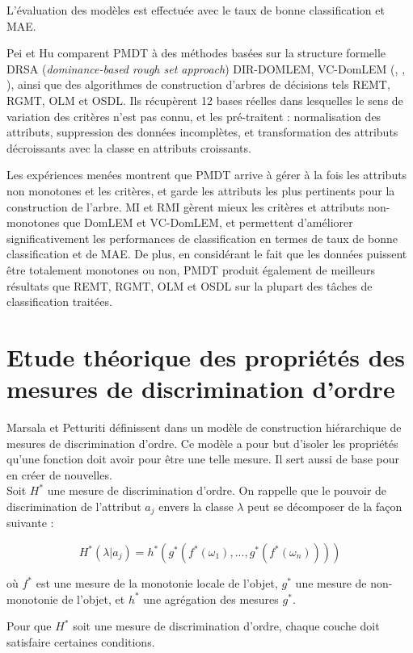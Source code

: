 \documentclass[a4paper]{article}
\begin{document}
L'évaluation des modèles est effectuée avec le taux de bonne classification et
MAE.

Pei et Hu comparent PMDT à des méthodes basées sur la structure formelle DRSA
(\emph{dominance-based rough set approach}) DIR-DOMLEM, VC-DomLEM
(\cite{blaszczynski-sequential}, \cite{blaszczynski-induction},
\cite{wang-induction}), ainsi que des algorithmes de construction d'arbres de
décisions tels REMT, RGMT, OLM et OSDL. Ils récupèrent 12 bases réelles dans
lesquelles le sens de variation des critères n'est pas connu, et les
pré-traitent : normalisation des attributs, suppression des données incomplètes,
et transformation des attributs décroissants avec la classe en attributs
croissants.

Les expériences menées montrent que PMDT arrive à gérer à la fois les attributs
non monotones et les critères, et garde les attributs les plus pertinents pour
la construction de l'arbre. MI et RMI gèrent mieux les critères et attributs
non-monotones que DomLEM et VC-DomLEM, et permettent d'améliorer
significativement les performances de classification en termes de taux de bonne
classification et de MAE. De plus, en considérant le fait que les données
puissent être totalement monotones ou non, PMDT produit également de meilleurs
résultats que REMT, RGMT, OLM et OSDL sur la plupart des tâches de
classification traitées.


\section{Etude théorique des propriétés des mesures de discrimination d'ordre}
Marsala et Petturiti définissent dans \cite{marsala-rank} un modèle de
construction hiérarchique de mesures de discrimination d'ordre. Ce modèle a pour
but d'isoler les propriétés qu'une fonction doit avoir pour être une telle
mesure. Il sert aussi de base pour en créer de nouvelles. \\

Soit $H^*$ une mesure de discrimination d'ordre. On rappelle que le pouvoir de
discrimination de l'attribut $a_j$ envers la classe $\lambda$ peut se décomposer
de la façon suivante :

$$ H^*(\lambda|a_j) = h^*(g^*(f^*(\omega_1),...,g^*(f^*(\omega_n))))$$

où $f^*$ est une mesure de la monotonie locale de l'objet, $g^*$ une mesure
de non-monotonie de l'objet, et $h^*$ une agrégation des mesures $g^*$.

Pour que $H^*$ soit une mesure de discrimination d'ordre, chaque couche doit
satisfaire certaines conditions.
\end{document}
